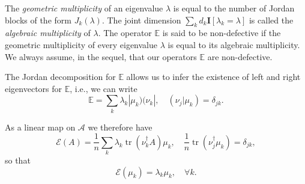 \documentclass[11pt,oneside]{amsart}
\DeclareMathOperator{\tr}{tr}
\theoremstyle{plain}%
\theoremstyle{definition}
\theoremstyle{remark}
\begin{document}
The \emph{geometric multiplicity} of an eigenvalue $\lambda$ is equal to the number of Jordan blocks of the form $J_k(\lambda)$. The joint dimension $\sum_{k} d_k \mathbf{I}[\lambda_k = \lambda] $ is called the \emph{algebraic multiplicity} of $\lambda$. The operator $\mathbb{E}$ is said to be non-defective if the geometric multiplicity of every eigenvalue $\lambda$ is equal to its algebraic multiplicity. We always assume, in the sequel, that our operators $\mathbb{E}$ are non-defective.

The Jordan decomposition for $\mathbb{E}$ allows us to infer the existence of left and right eigenvectors for $\mathbb{E}$, i.e., we can write
\begin{equation}
	\mathbb{E} = \sum_{k} \lambda_k |\mu_k )( \nu_k|, \quad (\nu_j|\mu_k) = \delta_{jk}.
\end{equation}

As a linear map on $\mathcal{A}$ we therefore have
\begin{equation}
	\mathcal{E}(A) = \frac{1}{n}\sum_{k} \lambda_k \tr(\nu_k^\dag A)\mu_k, \quad \frac1n\tr(\nu_j^\dag \mu_k) = \delta_{jk},
\end{equation}
so that
\begin{equation}
	\mathcal{E}(\mu_k) = \lambda_k \mu_k, \quad \forall k.
\end{equation}
\end{document}
